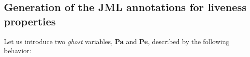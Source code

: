 












\subsection{Generation of the JML annotations for liveness properties}



Let us introduce two \textit{ghost} variables, \textbf{Pa} and \textbf{Pe}, described by the following behavior:


